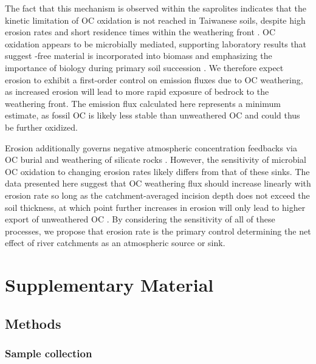 The fact that this mechanism is observed within the saprolites indicates that the kinetic limitation of OC oxidation is not reached in Taiwanese soils, despite high erosion rates and short residence times within the weathering front \citep{Dadson:2003kl}. OC oxidation appears to be microbially mediated, supporting laboratory results that suggest -free material is incorporated into biomass \citep{Petsch:2001eq,Petsch:2005gd} and emphasizing the importance of biology during primary soil succession \citep{Brantley:2011ku}. We therefore expect erosion to exhibit a first-order control on  emission fluxes due to OC weathering, as increased erosion will lead to more rapid exposure of bedrock to the weathering front. The  emission flux calculated here represents a minimum estimate, as fossil OC is likely less stable than unweathered OC and could thus be further oxidized.

Erosion additionally governs negative atmospheric  concentration feedbacks via OC burial \citep{FranceLanord:1997ua,Galy:2007ev} and weathering of silicate rocks \citep{West:2012cp,Maher:2014kq}. However, the sensitivity of microbial OC oxidation to changing erosion rates likely differs from that of these  sinks. The data presented here suggest that OC weathering flux should increase linearly with erosion rate so long as the catchment-averaged incision depth does not exceed the soil thickness, at which point further increases in erosion will only lead to higher export of unweathered OC \citep{Hilton:2011jw}. By considering the sensitivity of all of these processes, we propose that erosion rate is the primary control determining the net effect of river catchments as an atmospheric  source or sink.

\clearpage

\section{Supplementary Material}

\subsection{Methods}\label{Ch6M}

\subsubsection{Sample collection}

